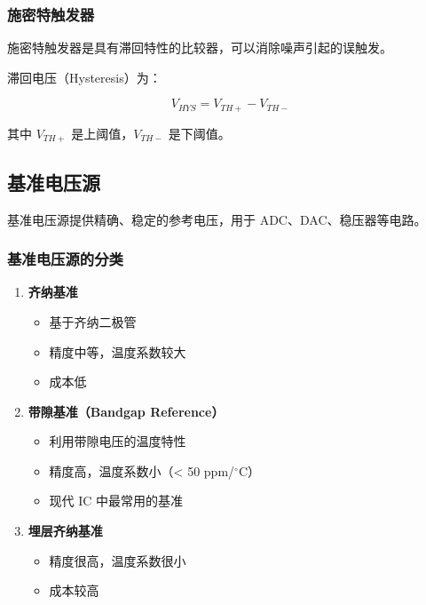 \subsubsection{施密特触发器}

施密特触发器是具有滞回特性的比较器，可以消除噪声引起的误触发。

滞回电压（Hysteresis）为：

\begin{equation}
V_{HYS} = V_{TH+} - V_{TH-} \label{eq:schmitt-hysteresis}
\end{equation}

其中 $V_{TH+}$ 是上阈值，$V_{TH-}$ 是下阈值。

\subsection{基准电压源}

基准电压源提供精确、稳定的参考电压，用于 ADC、DAC、稳压器等电路。

\subsubsection{基准电压源的分类}

\begin{enumerate}
  \item \textbf{齐纳基准}
    \begin{itemize}
      \item 基于齐纳二极管
      \item 精度中等，温度系数较大
      \item 成本低
    \end{itemize}

  \item \textbf{带隙基准（Bandgap Reference）}
    \begin{itemize}
      \item 利用带隙电压的温度特性
      \item 精度高，温度系数小（< 50 ppm/$^\circ$C）
      \item 现代 IC 中最常用的基准
    \end{itemize}

  \item \textbf{埋层齐纳基准}
    \begin{itemize}
      \item 精度很高，温度系数很小
      \item 成本较高
    \end{itemize}
\end{enumerate}

